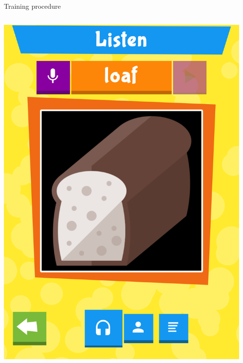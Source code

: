 \documentclass[final,xcolor={cmyk,hyperref}]{beamer}
\begin{document}
\begin{frame}[t]
\begin{columns}[t]
\begin{column}{0.45\linewidth}
\begin{block}{Training procedure}
\begin{columns}
\begin{column}{\screenshotwidth}
    \includegraphics[width=\linewidth]{images/CALVin-screenshots/jpgs/word}
  \end{column}
  \begin{column}{\screenshotwidth}

\end{column}
\end{columns}
\end{block}
\end{column}
\end{columns}
\end{frame}
\end{document}
